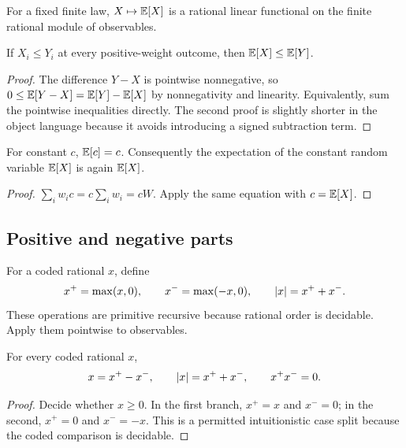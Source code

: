 \begin{corollary}\label{cor:linear-form}
For a fixed finite law, \(X\mapsto\mathbb E[X]\) is a rational linear functional on
the finite rational module of observables.
\end{corollary}

\begin{theorem}[Monotonicity]\label{thm:monotone}
If \(X_i\le Y_i\) at every positive-weight outcome, then
\(\mathbb E[X]\le\mathbb E[Y]\).
\end{theorem}

\begin{proof}
The difference \(Y-X\) is pointwise nonnegative, so
\(0\le\mathbb E[Y-X]=\mathbb E[Y]-\mathbb E[X]\) by nonnegativity and linearity.
Equivalently, sum the pointwise inequalities directly.  The second proof is
slightly shorter in the object language because it avoids introducing a
signed subtraction term.
\end{proof}

\begin{corollary}\label{cor:constant}
For constant \(c\), \(\mathbb E[c]=c\).  Consequently the expectation of the constant
random variable \(\mathbb E[X]\) is again \(\mathbb E[X]\).
\end{corollary}

\begin{proof}
\(\sum_iw_ic=c\sum_iw_i=cW\).  Apply the same equation with
\(c=\mathbb E[X]\).
\end{proof}

\subsection{Positive and negative parts}

\begin{definition}\label{def:parts}
For a coded rational \(x\), define
\[
 x^+=\max(x,0),\qquad x^-=\max(-x,0),\qquad \lvert x\rvert=x^++x^-.
\]
These operations are primitive recursive because rational order is decidable.
Apply them pointwise to observables.
\end{definition}

\begin{lemma}\label{lem:part-identities}
For every coded rational \(x\),
\[
 x=x^+-x^-,\qquad \lvert x\rvert=x^++x^-,\qquad x^+x^-=0.
\]
\end{lemma}

\begin{proof}
Decide whether \(x\ge0\).  In the first branch, \(x^+=x\) and \(x^-=0\); in
the second, \(x^+=0\) and \(x^-=-x\).  This is a permitted intuitionistic
case split because the coded comparison is decidable.
\end{proof}

